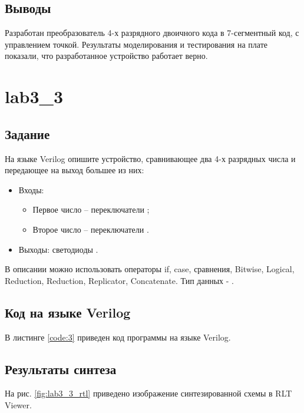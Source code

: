 \subsection{Выводы}

Разработан преобразователь 4-х разрядного двоичного кода в 7-сегментный код, с управлением точкой. Результаты моделирования и тестирования на плате показали, что разработанное устройство работает верно.

\section{lab3\_3}

\subsection{Задание}

На языке Verilog опишите устройство, сравнивающее два 4-х разрядных числа и передающее на выход большее из них:
\begin{itemize}
\item Входы:
	\begin{itemize}
		\item Первое число -- переключатели ;
		\item Второе число -- переключатели .
	\end{itemize}
\item Выходы: светодиоды .
\end{itemize}

В описании можно использовать операторы if, case, сравнения, Bitwise, Logical, Reduction, Reduction, Replicator, Concatenate. Тип данных - .

\subsection{Код на языке Verilog}

В листинге \ref{code:3} приведен код программы на языке Verilog.

%

\subsection{Результаты синтеза}

На рис. \ref{fig:lab3_3_rtl} приведено изображение синтезированной схемы в RLT Viewer.

